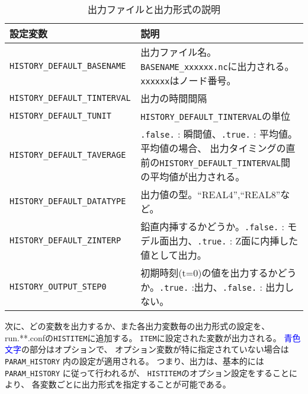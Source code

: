 \begin{table}[htb]
\begin{center}
\caption{出力ファイルと出力形式の説明}
\begin{tabularx}{150mm}{|l|X|} \hline
 \rowcolor[gray]{0.9} 設定変数 & 説明 \\ \hline
 \verb|HISTORY_DEFAULT_BASENAME  | & 出力ファイル名。\verb|BASENAME_xxxxxx.nc|に出力される。\verb|xxxxxx|はノード番号。\\ \hline
 \verb|HISTORY_DEFAULT_TINTERVAL | & 出力の時間間隔 \\ \hline
 \verb|HISTORY_DEFAULT_TUNIT     | & \verb|HISTORY_DEFAULT_TINTERVAL|の単位\\ \hline
 \verb|HISTORY_DEFAULT_TAVERAGE  | & \verb|.false.| : 瞬間値、\verb|.true.| : 平均値。平均値の場合、
 出力タイミングの直前の\verb|HISTORY_DEFAULT_TINTERVAL|間の平均値が出力される。\\ \hline
 \verb|HISTORY_DEFAULT_DATATYPE  | & 出力値の型。``REAL4'',``REAL8''など。\\ \hline
 \verb|HISTORY_DEFAULT_ZINTERP   | & 鉛直内挿するかどうか。\verb|.false.| : モデル面出力、\verb|.true.| : Z面に内挿した値として出力。\\ \hline
 \verb|HISTORY_OUTPUT_STEP0      | & 初期時刻(t=0)の値を出力するかどうか。\verb|.true.| :出力、\verb|.false.| : 出力しない。\\ \hline
\end{tabularx}
\label{tab:history_settings}
\end{center}
\end{table}


次に、どの変数を出力するか、また各出力変数毎の出力形式の設定を、
run.**.confの\verb|HISTITEM|に追加する。
\verb|ITEM|に設定された変数が出力される。
\textcolor{blue}{青色文字}の部分はオプションで、
オプション変数が特に指定されていない場合は 
\verb|PARAM_HISTORY| 内の設定が適用される。
つまり、出力は、基本的には \verb|PARAM_HISTORY| に従って行われるが、
\verb|HISTITEM|のオプション設定をすることにより、
各変数ごとに出力形式を指定することが可能である。\\


\\


